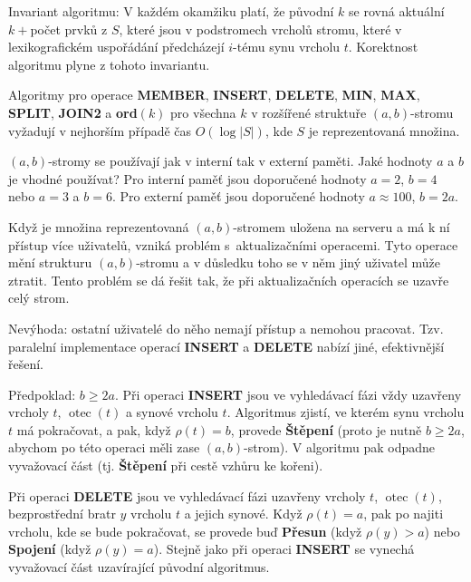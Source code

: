 \documentclass[a4paper,12pt]{article}
\DeclareMathOperator*{\otec}{otec}
\begin{document}
Invariant algoritmu: V každém okamžiku platí, 
že původní $k$ se rovná aktuální $k+$počet prvků z 
$S$, které jsou v podstromech vrcholů stromu, které v 
lexikografickém uspořádání předcházejí $i$-tému synu 
vrcholu $t$. Korektnost algoritmu plyne z tohoto 
invariantu.

\begin{veta}Algoritmy pro operace {\bf MEMBER}, {\bf INSERT}, 
{\bf DE\-LETE}, {\bf MIN}, {\bf MAX}, {\bf SPLIT}, {\bf JOIN2} a {\bf ord$
(k)$} pro všechna $k$ v 
rozšířené struktuře $(a,b)$-stromu vy\-ža\-dují v 
nejhorším pří\-pa\-dě čas $O(\log|S|)$, kde $S$ je reprezentovaná 
množina.  
\end{veta}

$(a,b)$-stromy se používají jak v interní tak v 
externí paměti. Jaké hodnoty $a$ a $b$ je vhodné 
používat?\newline 
Pro interní paměť jsou doporučené hodnoty $a=2$, $
b=4$ 
nebo $a=3$ a $b=6$.\newline 
Pro externí paměť jsou doporučené hodnoty $a\approx 
100$, 
$b=2a$.

Když je množina reprezentovaná $(a,b)$-stromem 
uložena na serveru a má k ní přístup více 
uživatelů, vzniká problém s~aktualizačními 
operacemi. Tyto operace mění strukturu $(a,b)$-stromu a 
v důsledku toho se v něm jiný uživatel 
může ztratit. Tento problém se dá  
řešit tak, že při aktu\-alizačních operacích 
se uzavře celý strom.

 

Nevýhoda: ostatní uživatelé  
do něho nemají přístup a nemohou pracovat. Tzv. paralelní 
implementace operací {\bf INSERT} a {\bf DELETE} nabízí jiné, 
efektivnější řešení.

Předpoklad: $b\ge 2a$. \newline 
Při operaci {\bf INSERT} jsou ve vyhledávací fázi vždy 
uzavřeny vrcholy $t$, $\otec(t)$ a synové vrcholu $t$. 
Algoritmus zjistí, ve kterém synu vrcholu $t$ má 
pokračovat, a pak, když $\rho (t)=b$, provede {\bf Štěpení }
(proto je nutně $b\ge 2a$, abychom po této ope\-raci měli 
zase $(a,b)$-strom). V algoritmu pak odpadne vyva\-žo\-vací 
část (tj. {\bf Štěpení} při cestě vzhůru ke 
kořeni).

Při operaci {\bf DELETE} jsou ve vyhledávací fázi uzavřeny 
vrcholy $t$, $\otec(t)$, bezprostřední bratr $y$ vrcholu $
t$ a 
jejich synové. 
Když $\rho (t)=a$, pak po najiti vrcholu, kde se bude 
pokračovat, se provede buď {\bf Přesun} (když $\rho (
y)>a$) nebo 
{\bf Spojení} (když $\rho (y)=a$). Stejně jako při operaci 
{\bf INSERT} se vynechá vyva\-žo\-vací část 
uzavírající původní algoritmus.
\end{document}
